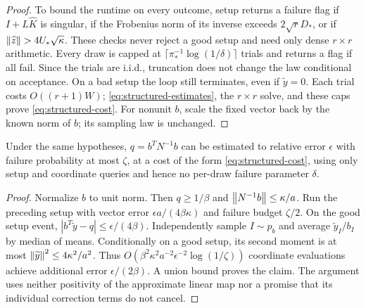 \begin{proof}
To bound the runtime on every outcome, setup returns a failure flag
if $I+L\widehat K$ is singular, if the Frobenius norm of its inverse
exceeds $2\sqrt r D_*$, or if $\left\lVert\widehat z\right\rVert>4U_*\sqrt\kappa$. These
checks never reject a good setup and need only dense $r\times r$
arithmetic. Every draw is capped at
$\lceil\pi_*^{-1}\log(1/\delta)\rceil$ trials and returns a flag if all
fail. Since the trials are i.i.d., truncation does not change the law
conditional on acceptance. On a bad setup the loop still terminates, even if
$\widetilde y=0$. Each trial costs $O((r+1)W)$;
\eqref{eq:structured-estimates}, the $r\times r$ solve, and these caps
prove \eqref{eq:structured-cost}. For nonunit $b$, scale the fixed vector
back by the known norm of $b$; its sampling law is unchanged.
\end{proof}

\begin{corollary}\label{cor:structured-scalar}
Under the same hypotheses, $q=b^TN^{-1}b$ can be estimated to relative
error $\epsilon$ with failure probability at most $\zeta$, at a cost of
the form \eqref{eq:structured-cost}, using only setup and coordinate
queries and hence no per-draw failure parameter $\delta$.
\end{corollary}
\begin{proof}
Normalize $b$ to unit norm. Then $q\geq1/\beta$ and
$\left\lVert N^{-1}b\right\rVert\leq\kappa/a$. Run the preceding setup with vector
error $\epsilon a/(4\beta\kappa)$ and failure budget $\zeta/2$.
On the good setup event, $|b^T\widetilde y-q|\leq\epsilon/(4\beta)$. Independently sample
$I\sim p_b$ and average $\widetilde y_I/b_I$ by median of means.
Conditionally on a good setup, its second moment is at most
$\left\lVert\widetilde y\right\rVert^2\leq4\kappa^2/a^2$.
Thus $O(\beta^2\kappa^2a^{-2}\epsilon^{-2}\log(1/\zeta))$
coordinate evaluations achieve additional error $\epsilon/(2\beta)$.
A union bound proves the claim. The argument uses neither positivity of
the approximate linear map nor a promise that its individual correction
terms do not cancel.
\end{proof}

